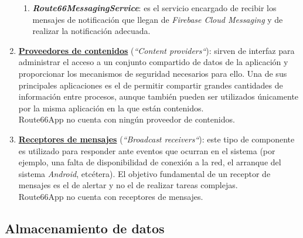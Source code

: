 \documentclass[twoside]{report}
\begin{document}
\begin{enumerate}
\begin{enumerate}
	\item \textbf{\textit{Route66MessagingService}}: es el servicio encargado de recibir los mensajes de notificación que llegan de \textit{Firebase Cloud Messaging} y de realizar la notificación adecuada.
	\end{enumerate}

\item \textbf{\underline{Proveedores de contenidos}} (\textit{“Content providers“}): sirven de interfaz para administrar el acceso a un conjunto compartido de datos de la aplicación y proporcionar los mecanismos de seguridad necesarios para ello. Una de sus principales aplicaciones es el de permitir compartir grandes cantidades de información entre procesos, aunque también pueden ser utilizados únicamente por la misma aplicación en la que están contenidos.\\
Route66App no cuenta con ningún proveedor de contenidos.

\item \textbf{\underline{Receptores de mensajes}} (\textit{“Broadcast receivers“}): este tipo de componente es utilizado para responder ante eventos que ocurran en el sistema (por ejemplo, una falta de disponibilidad de conexión a la red, el arranque del sistema \textit{Android}, etcétera). El objetivo fundamental de un receptor de mensajes es el de alertar y no el de realizar tareas complejas. \\
Route66App no cuenta con receptores de mensajes.
\end{enumerate}

\subsection{Almacenamiento de datos}
\end{document}
